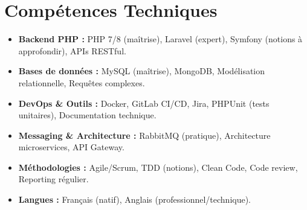 \documentclass[a4paper,11pt]{article}
\begin{document}
\section{Compétences Techniques}
\begin{itemize}[leftmargin=*, nosep]
    \item \small{\textbf{Backend PHP :} PHP 7/8 (maîtrise), Laravel (expert), Symfony (notions à approfondir), APIs RESTful.}
    \item \small{\textbf{Bases de données :} MySQL (maîtrise), MongoDB, Modélisation relationnelle, Requêtes complexes.}
    \item \small{\textbf{DevOps \& Outils :} Docker, GitLab CI/CD, Jira, PHPUnit (tests unitaires), Documentation technique.}
    \item \small{\textbf{Messaging \& Architecture :} RabbitMQ (pratique), Architecture microservices, API Gateway.}
    \item \small{\textbf{Méthodologies :} Agile/Scrum, TDD (notions), Clean Code, Code review, Reporting régulier.}
    \item \small{\textbf{Langues :} Français (natif), Anglais (professionnel/technique).}
\end{itemize}

\end{document}
